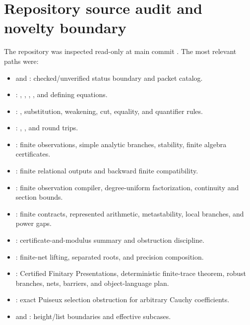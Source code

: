 \section{Repository source audit and novelty boundary}
\label{app:source-audit}

The repository was inspected read-only at main commit
.  The most relevant paths were:

\begin{itemize}
\item {} and : checked/unverified status boundary and packet catalog.
\item {}: , , , , and defining equations.
\item {}: , substitution, weakening, cut, equality, and quantifier rules.
\item {}: , , and round trips.
\item {}: finite observations, simple analytic branches, stability, finite algebra certificates.
\item {}: finite relational outputs and backward finite compatibility.
\item {}: finite observation compiler, degree-uniform factorization, continuity and section bounds.
\item {}: finite contracts, represented arithmetic, metastability, local branches, and power gaps.
\item {}: certificate-and-modulus summary and obstruction discipline.
\item {}: finite-net lifting, separated roots, and precision composition.
\item {}: Certified Finitary Presentations, deterministic finite-trace theorem, robust branches, nets, barriers, and object-language plan.
\item {}: exact Puiseux selection obstruction for arbitrary Cauchy coefficients.
\item {} and : height/list boundaries and effective subcases.
\end{itemize}

